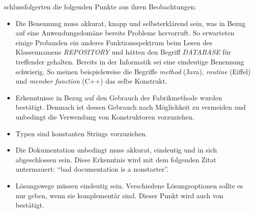 \cite{Piccioni:2013uq} schlussfolgerten die folgenden Punkte aus ihren Beobachtungen:
\begin{itemize}
  \item Die Benennung muss akkurat, knapp und selbsterklärend sein, was in Bezug auf eine Anwendungsdomäne bereits Probleme hervorruft. So erwarteten einige Probanden ein anderes Funktionsspektrum beim Lesen des Klassennamens \textit{REPOSITORY} und hätten den Begriff \textit{DATABASE} für treffender gehalten. Bereits in der Informatik sei eine eindeutige Benennung schwierig. So meinen beispielsweise die Begriffe \textit{method} (Java), \textit{routine} (Eiffel) und \textit{member function} (C++) das selbe Konstrukt.
  \item Erkenntnisse in Bezug auf den Gebrauch der Fabrikmethode \citep{Ellis:2007kv} wurden bestätigt. Demnach ist dessen Gebrauch nach Möglichkeit zu vermeiden und unbedingt die Verwendung von Konstruktoren vorzuziehen.
  \item Typen sind konstanten Strings vorzuziehen. 
  \item Die Dokumentation unbedingt muss akkurat, eindeutig und in sich abgeschlossen sein. Diese Erkenntnis wird mit dem folgenden Zitat untermauert: ``bad documentation is a nonstarter''.
  \item Lösungswege müssen eindeutig sein. Verschiedene Lösungsoptionen sollte es nur geben, wenn sie komplementär sind. Dieser Punkt wird auch von \cite{Zibran:2011fx} bestätigt.
\end{itemize}


